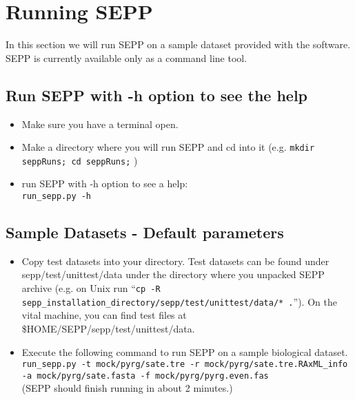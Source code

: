 \documentclass[11pt]{article} %
\newcommand{\sepp}{SEPP\xspace}
\newcommand{\ins}[1]{{\tt #1}}
\newcommand{\file}[1]{{\sf #1}}
\begin{document}
\section{Running \sepp}
In this section we will run \sepp on a sample dataset provided with the software. \sepp is currently available only as a command line tool. 

\subsection{Run \sepp with -h option to see the help}

\begin{itemize}
\item Make sure you have a terminal open.
\item Make a directory where you will run \sepp and cd into it (e.g. \ins{mkdir seppRuns; cd seppRuns;} )
\item run \sepp with -h option to see a help:\\

\ins{run\_sepp.py -h}
\end{itemize}


\subsection{Sample Datasets - Default parameters}
\begin{itemize}
\item Copy test datasets into your directory. Test datasets can be found under \file{sepp/test/unittest/data} under the directory where you unpacked \sepp archive (e.g. on Unix run ``\ins{cp -R sepp\_installation\_directory/sepp/test/unittest/data/*  .}''). On the vital machine, you can find test files at \file{\$HOME/SEPP/sepp/test/unittest/data}. 
\item Execute the following command to run \sepp on a sample biological dataset.\\

\ins{run\_sepp.py -t mock/pyrg/sate.tre -r mock/pyrg/sate.tre.RAxML\_info -a mock/pyrg/sate.fasta -f mock/pyrg/pyrg.even.fas} \\

(\sepp should finish running in about 2 minutes.) 
\end{itemize}
\end{document}
